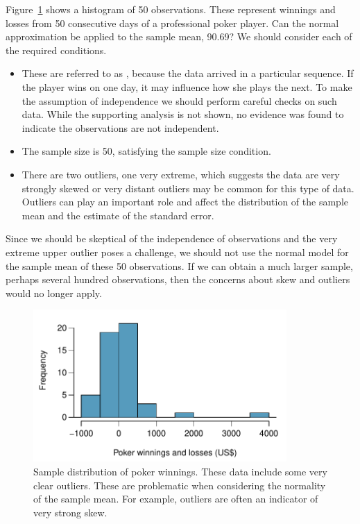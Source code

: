\begin{example}{Figure~\ref{pokerProfitsCanApplyNormalToSampMean} shows a histogram of 50 observations. These represent winnings and losses from 50 consecutive days of a professional poker player. Can the normal approximation be applied to the sample mean, 90.69?}
We should consider each of the required conditions.
\begin{itemize}
\setlength{\itemsep}{0mm}
\item[(1)] These are referred to as , because the data arrived in a particular sequence. If the player wins on one day, it may influence how she plays the next. To make the assumption of independence we should perform careful checks on such data. While the supporting analysis is not shown, no evidence was found to indicate the observations are not independent.
\item[(2)] The sample size is 50, satisfying the sample size condition.
\item[(3)] There are two outliers, one very extreme, which suggests the data are very strongly skewed or very distant outliers may be common for this type of data. Outliers can play an important role and affect the distribution of the sample mean and the estimate of the standard error.
\end{itemize}
Since we should be skeptical of the independence of observations and the very extreme upper outlier poses a challenge, we should not use the normal model for the sample mean of these 50 observations. If we can obtain a much larger sample, perhaps several hundred observations, then the concerns about skew and outliers would no longer apply.
\end{example}

\begin{figure}[ht]
   \centering
   \includegraphics[height=58mm]{04/figures/pokerProfitsCanApplyNormalToSampMean/pokerProfitsCanApplyNormalToSampMean}
   \caption{Sample distribution of poker winnings. These data include some very clear outliers. These are problematic when considering the normality of the sample mean. For example, outliers are often an indicator of very strong skew.}
   \label{pokerProfitsCanApplyNormalToSampMean}
\end{figure}

